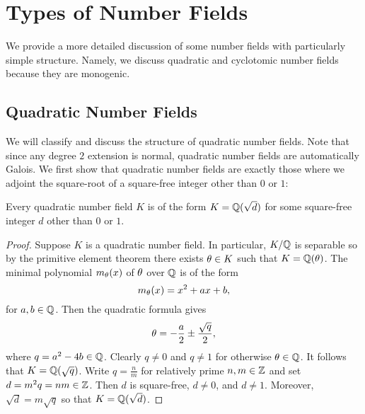 \chapter{Types of Number Fields}
  We provide a more detailed discussion of some number fields with particularly simple structure. Namely, we discuss quadratic and cyclotomic number fields because they are monogenic.
  \section{Quadratic Number Fields}
    We will classify and discuss the structure of quadratic number fields. Note that since any degree $2$ extension is normal, quadratic number fields are automatically Galois. We first show that quadratic number fields are exactly those where we adjoint the square-root of a square-free integer other than $0$ or $1$:

    \begin{proposition}\label{prop:classification_of_quadratic_number_fields}
      Every quadratic number field $K$ is of the form $K = \mathbb{Q}(\sqrt{d})$ for some square-free integer $d$ other than $0$ or $1$.
    \end{proposition}
    \begin{proof}
      Suppose $K$ is a quadratic number field. In particular, $K/\mathbb{Q}$ is separable so by the primitive element theorem there exists $\theta \in K$ such that $K = \mathbb{Q}(\theta)$. The minimal polynomial $m_{\theta}(x)$ of $\theta$ over $\mathbb{Q}$ is of the form
      \[
        m_{\theta}(x) = x^{2}+ax+b,
      \]
      for $a,b \in \mathbb{Q}$. Then the quadratic formula gives
      \[
        \theta = -\frac{a}{2}\pm\frac{\sqrt{q}}{2},
      \]
      where $q = a^{2}-4b \in \mathbb{Q}$. Clearly $q \neq 0$ and $q \neq 1$ for otherwise $\theta \in \mathbb{Q}$. It follows that $K = \mathbb{Q}(\sqrt{q})$. Write $q = \frac{n}{m}$ for relatively prime $n,m \in \mathbb{Z}$ and set $d = m^{2}q = nm \in \mathbb{Z}$. Then $d$ is square-free, $d \neq 0$, and $d \neq 1$. Moreover, $\sqrt{d} = m\sqrt{q}$ so that $K = \mathbb{Q}(\sqrt{d})$. 
    \end{proof}

